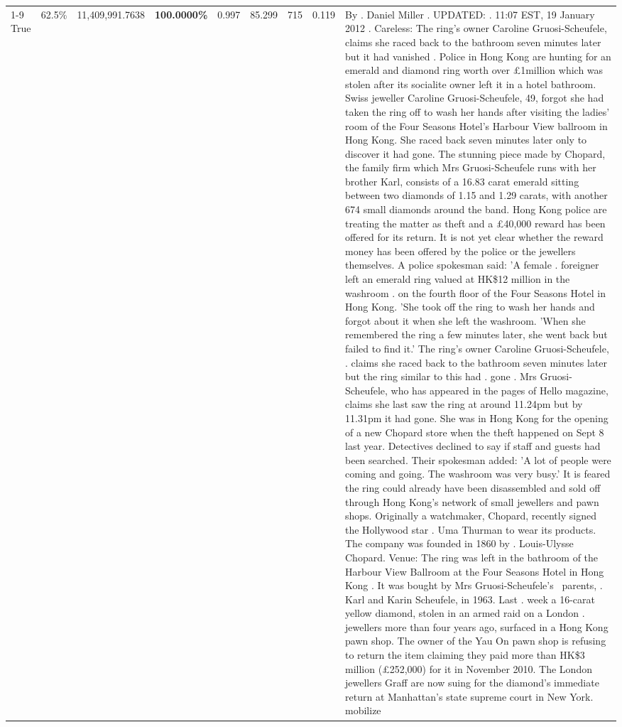 \begin{table}[H]
\begin{tabular}{lllrlllll}
\cline{1-9} \cline{2-9}
True & 62.5\% & 11,409,991.7638 & \bfseries \color{red} 100.0000\% & 0.997 & 85.299 & 715 & 0.119 & By . Daniel Miller . UPDATED: . 11:07 EST, 19 January 2012 . Careless: The ring's owner Caroline Gruosi-Scheufele, claims she raced back to the bathroom seven minutes later but it had vanished . Police in Hong Kong are hunting for an emerald and diamond ring worth over £1million which was stolen after its socialite owner left it in a hotel bathroom. Swiss jeweller Caroline Gruosi-Scheufele, 49, forgot she had taken the ring off to wash her hands after visiting the ladies' room of the Four Seasons Hotel's Harbour View ballroom in Hong Kong. She raced back seven minutes later only to discover it had gone. The stunning piece made by Chopard, the family firm which Mrs Gruosi-Scheufele runs with her brother Karl, consists of a 16.83 carat emerald sitting between two diamonds of 1.15 and 1.29 carats, with another 674 small diamonds around the band. Hong Kong police are treating the matter as theft and a £40,000 reward has been offered for its return. It is not yet clear whether the reward money has been offered by the police or the jewellers themselves. A police spokesman said: 'A female . foreigner left an emerald ring valued at HK\$12 million in the washroom . on the fourth floor of the Four Seasons Hotel in Hong Kong. 'She took off the ring to wash her hands and forgot about it when she left the washroom. 'When she remembered the ring a few minutes later, she went back but failed to find it.' The ring's owner Caroline Gruosi-Scheufele, . claims she raced back to the bathroom seven minutes later but the ring similar to this had . gone . Mrs Gruosi-Scheufele, who has appeared in the pages of Hello magazine, claims she last saw the ring at around 11.24pm but by 11.31pm it had gone. She was in Hong Kong for the opening of a new Chopard store when the theft happened on Sept 8 last year. Detectives declined to say if staff and guests had been searched. Their spokesman added: 'A lot of people were coming and going. The washroom was very busy.' It is feared the ring could already have been disassembled and sold off through Hong Kong's network of small jewellers and pawn shops. Originally a watchmaker, Chopard, recently signed the Hollywood star . Uma Thurman to wear its products. The company was founded in 1860 by . Louis-Ulysse Chopard. Venue: The ring was left in the bathroom of the Harbour View Ballroom at the Four Seasons Hotel in Hong Kong . It was bought by Mrs Gruosi-Scheufele's  parents, . Karl and Karin Scheufele, in 1963. Last . week a 16-carat yellow diamond, stolen in an armed raid on a London . jewellers more than four years ago, surfaced in a Hong Kong pawn shop. The owner of the Yau On pawn shop is refusing to return the item claiming they paid more than HK\$3 million (£252,000) for it in November 2010. The London jewellers Graff are now suing for the diamond’s immediate return at Manhattan’s state supreme court in New York. mobilize \\

\end{tabular}
\end{table}
